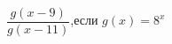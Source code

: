 \begin{ex}[type=calculate_expression]
	\begin{condition}
		\( \dfrac{g(x-9)}{g(x-11)} \),\quad если \( g(x)=8^x \)
	\end{condition}
\end{ex}